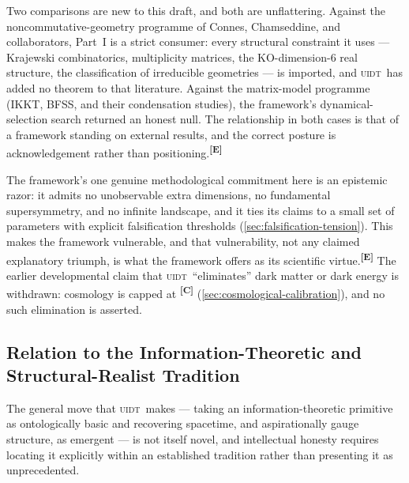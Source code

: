 \documentclass[12pt,a4paper,twoside]{article}
\theoremstyle{plain}
\theoremstyle{definition}
\theoremstyle{remark}
\newcommand{\UIDT}{\textsc{uidt}}
\newcommand{\catmark}[1]{\textsuperscript{\textsf{\textbf{[#1]}}}}
\begin{document}
Two comparisons are new to this draft, and both are unflattering. Against
the noncommutative-geometry programme of Connes, Chamseddine, and
collaborators, Part~I is a strict consumer: every structural constraint
it uses --- Krajewski combinatorics, multiplicity matrices, the
KO-dimension-6 real structure, the classification of irreducible
geometries --- is imported, and \UIDT\ has added no theorem to that
literature. Against the matrix-model programme (IKKT, BFSS, and their
condensation studies), the framework's dynamical-selection search
returned an honest null. The relationship in both cases is that of a
framework standing on external results, and the correct posture is
acknowledgement rather than positioning.\catmark{E}

The framework's one genuine methodological commitment here is an
epistemic razor: it admits no unobservable extra dimensions, no
fundamental supersymmetry, and no infinite landscape, and it ties its
claims to a small set of parameters with explicit falsification
thresholds (\cref{sec:falsification-tension}). This makes the framework
vulnerable, and that vulnerability, not any claimed explanatory triumph,
is what the framework offers as its scientific virtue.\catmark{E} The
earlier developmental claim that \UIDT\ ``eliminates'' dark matter or
dark energy is withdrawn: cosmology is capped at \catmark{C}
(\cref{sec:cosmological-calibration}), and no such elimination is
asserted.

\subsection{Relation to the Information-Theoretic and Structural-Realist Tradition}
\label{subsec:prior-art}

The general move that \UIDT\ makes --- taking an information-theoretic
primitive as ontologically basic and recovering spacetime, and
aspirationally gauge structure, as emergent --- is not itself novel, and
intellectual honesty requires locating it explicitly within an
established tradition rather than presenting it as unprecedented.
\end{document}
